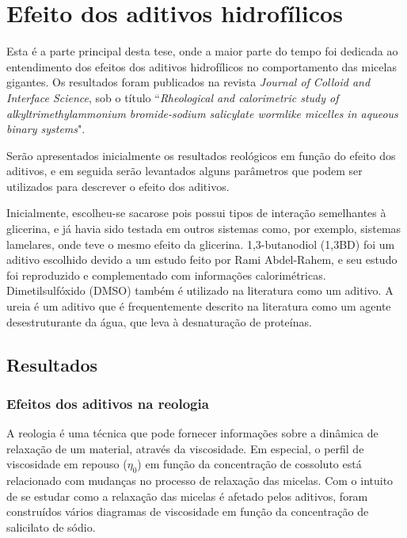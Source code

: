 \part{Efeito dos aditivos hidrofílicos}
	
	Esta é a parte principal desta tese, onde a maior parte do tempo foi dedicada ao entendimento dos efeitos dos aditivos hidrofílicos no comportamento das micelas gigantes. Os resultados foram publicados na revista \emph{Journal of Colloid and Interface Science}, sob o título ``\emph{Rheological and calorimetric study of alkyltrimethylammonium bromide-sodium salicylate wormlike micelles in aqueous binary systems}".
	
	Serão apresentados inicialmente os resultados reológicos em função do efeito dos aditivos, e em seguida serão levantados alguns parâmetros que podem ser utilizados para descrever o efeito dos aditivos.
	
	Inicialmente, escolheu-se sacarose pois possui tipos de interação semelhantes à glicerina, e já havia sido testada em outros sistemas como, por exemplo, sistemas lamelares, onde teve o mesmo efeito da glicerina. 1,3-butanodiol (1,3BD) foi um aditivo escolhido devido a um estudo feito por Rami Abdel-Rahem, e seu estudo foi reproduzido e complementado com informações calorimétricas. Dimetilsulfóxido (DMSO) também é utilizado na literatura como um aditivo. A ureia é um aditivo que é frequentemente descrito na literatura como um agente desestruturante da água, que leva à desnaturação de proteínas.
	
	
	\chapter{Resultados}
		\section{Efeitos dos aditivos na reologia}
			
			A reologia é uma técnica que pode fornecer informações sobre a dinâmica de relaxação de um material, através da viscosidade. Em especial, o perfil de viscosidade em repouso (\(\eta_0\)) em função da concentração de cossoluto está relacionado com mudanças no processo de relaxação das micelas. Com o intuito de se estudar como a relaxação das micelas é afetado pelos aditivos, foram construídos vários diagramas de viscosidade em função da concentração de salicilato de sódio.
			
